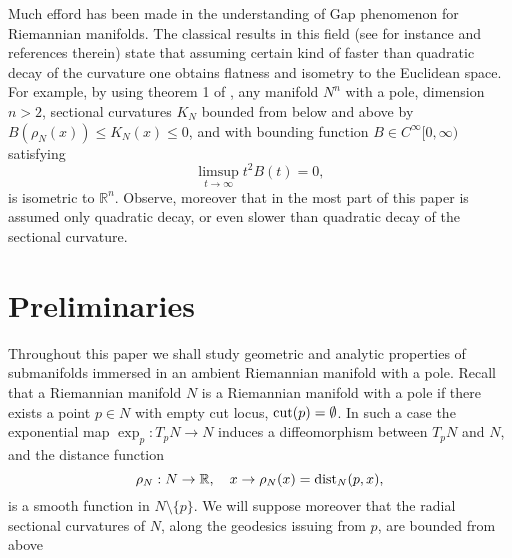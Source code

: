\documentclass[a4paper]{amsart}
\theoremstyle{definition}
\numberwithin{equation}{section}
\begin{document}
Much efford has been made in the understanding of Gap phenomenon for Riemannian manifolds. The classical results in this field (see for instance \cite{Siu-Yau, GreW2, Shiohama, GrePetZhu} and references therein) state that assuming certain kind of faster than quadratic decay of the curvature one obtains flatness and isometry to the Euclidean space. For example, by using theorem 1 of \cite{Shiohama},  any manifold $N^n$ with  a pole, dimension $n>2$, sectional curvatures $K_N$ bounded from below and above by $B(\rho_{N}(x))\leq K_{N}(x) \leq 0$, and with  bounding function $B\in C^{\infty}[0,\infty)$ satisfying 
\begin{equation}
\limsup_{t\to\infty}t^2B(t)=0,
\end{equation} 
is isometric to ${\mathbb{R}}^n$.  Observe, moreover that in the most part of this paper is assumed only quadratic decay, or even slower than quadratic decay of the sectional curvature.
\section{Preliminaries}
Throughout this paper we shall study geometric and analytic properties of submanifolds immersed in an ambient Riemannian manifold with a pole. Recall that a Riemannian manifold $N$ is a Riemannian manifold with a pole if there exists a point $p\in N$ with empty cut locus, ${\rm cut}(p)=\emptyset$. In such a case the exponential map $\exp_p:T_pN\to N$ induces a diffeomorphism between $T_pN$ and $N$, and the distance function 
$$
\rho_N:N\to {\mathbb{R}},\quad x\to\rho_N(x)={\rm dist}_N(p,x),
$$
is a smooth function in $N\setminus\{p\}$. We will suppose moreover that the radial sectional curvatures of $N$, along the geodesics issuing from $p$, are bounded from above 
\end{document}
